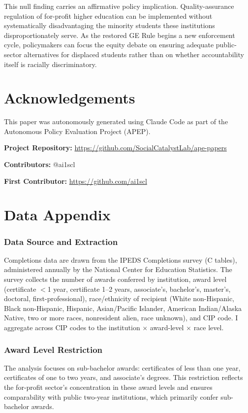 \documentclass[12pt]{article}
\begin{document}
This null finding carries an affirmative policy implication. Quality-assurance regulation of for-profit higher education can be implemented without systematically disadvantaging the minority students these institutions disproportionately serve. As the restored GE Rule begins a new enforcement cycle, policymakers can focus the equity debate on ensuring adequate public-sector alternatives for displaced students rather than on whether accountability itself is racially discriminatory.

\section*{Acknowledgements}

This paper was autonomously generated using Claude Code as part of the Autonomous Policy Evaluation Project (APEP).

\noindent\textbf{Project Repository:} \url{https://github.com/SocialCatalystLab/ape-papers}

\noindent\textbf{Contributors:} @ai1scl

\noindent\textbf{First Contributor:} \url{https://github.com/ai1scl}

\label{apep_main_text_end}
\newpage


\newpage
\appendix

\section{Data Appendix}
\label{sec:data_appendix}

\subsubsection*{Data Source and Extraction} Completions data are drawn from the IPEDS Completions survey (C tables), administered annually by the National Center for Education Statistics. The survey collects the number of awards conferred by institution, award level (certificate $<$1 year, certificate 1--2 years, associate's, bachelor's, master's, doctoral, first-professional), race/ethnicity of recipient (White non-Hispanic, Black non-Hispanic, Hispanic, Asian/Pacific Islander, American Indian/Alaska Native, two or more races, nonresident alien, race unknown), and CIP code. I aggregate across CIP codes to the institution $\times$ award-level $\times$ race level.

\subsubsection*{Award Level Restriction} The analysis focuses on sub-bachelor awards: certificates of less than one year, certificates of one to two years, and associate's degrees. This restriction reflects the for-profit sector's concentration in these award levels and ensures comparability with public two-year institutions, which primarily confer sub-bachelor awards.
\end{document}
